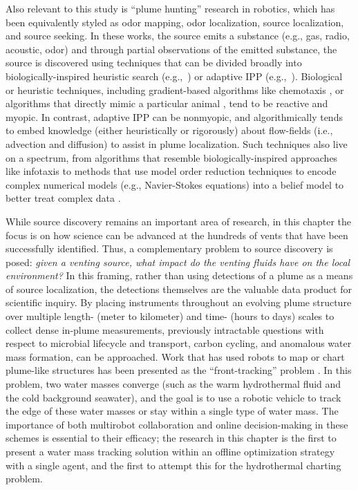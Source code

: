 Also relevant to this study is ``plume hunting'' research in robotics, which has been equivalently styled as odor mapping, odor localization, source localization, and source seeking. In these works, the source emits a substance (e.g., gas, radio, acoustic, odor) and through partial observations of the emitted substance, the source is discovered using techniques that can be divided broadly into biologically-inspired heuristic search (e.g.,~\cite{reddy2022olfactory,chen2019odor}) or adaptive IPP (e.g.,~\cite{salam2019adaptive}). Biological or heuristic techniques, including gradient-based algorithms like chemotaxis \autocite{morse1998robust}, or algorithms that directly mimic a particular animal \autocite{edwards2001representing}, tend to be reactive and myopic. In contrast, adaptive IPP can be nonmyopic, and algorithmically tends to embed knowledge (either heuristically or rigorously) about flow-fields (i.e., advection and diffusion) to assist in plume localization. Such techniques also live on a spectrum, from algorithms that resemble biologically-inspired approaches like infotaxis \autocite{vergassola2007infotaxis} to methods that use model order reduction techniques to encode complex numerical models (e.g., Navier-Stokes equations) into a belief model to better treat complex data \autocite{peng2014dynamic}.

While source discovery remains an important area of research, in this chapter the focus is on how science can be advanced at the hundreds of vents that have been successfully identified. Thus, a complementary problem to source discovery is posed: \emph{given a venting source, what impact do the venting fluids have on the local environment?} In this framing, rather than using detections of a plume as a means of source localization, the detections themselves are the valuable data product for scientific inquiry. By placing instruments throughout an evolving plume structure over multiple length- (meter to kilometer) and time- (hours to days) scales to collect dense in-plume measurements, previously intractable questions with respect to microbial lifecycle and transport, carbon cycling, and anomalous water mass formation, can be approached. Work that has used robots to map or chart plume-like structures has been presented as the ``front-tracking'' problem \autocite{li2014multi,chen2019odor}. In this problem, two water masses converge (such as the warm hydrothermal fluid and the cold background seawater), and the goal is to use a robotic vehicle to track the edge of these water masses or stay within a single type of water mass. The importance of both multirobot collaboration and online decision-making in these schemes is essential to their efficacy; the research in this chapter is the first to present a water mass tracking solution within an offline optimization strategy with a single agent, and the first to attempt this for the hydrothermal charting problem.


